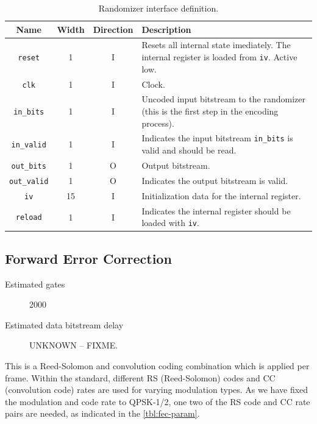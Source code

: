 \documentclass[dvips,10pt,twocolumn]{article}
\newcommand{\wire}{\texttt}
\begin{document}
\begin{table} \begin{tabularx}{\linewidth}{c|c|c|X}
	\label{tbl:rand-io}
	Name & Width & Direction & Description \\ \hline
	
	\wire{reset}     & 1  & I & Resets all internal state
	imediately. The internal register is loaded from
	\wire{iv}. Active low. \\

	\wire{clk}       & 1  & I & Clock. \\

	\wire{in\_bits}  & 1  & I & Uncoded input bitstream to the
	randomizer (this is the first step in the encoding process).\\

	\wire{in\_valid} & 1  & I & Indicates the input bitstream
	\wire{in\_bits} is valid and should be read. \\

	\wire{out\_bits} & 1  & O & Output bitstream. \\
	
	\wire{out\_valid} & 1  & O & Indicates the output bitstream
	is valid. \\

	\wire{iv}        & 15 & I & Initialization data for the
	internal register. \\

	\wire{reload}    & 1  & I & Indicates the internal
	register should be loaded with \wire{iv}. \\

\end{tabularx}
\caption{Randomizer interface definition.}
\end{table}
	

\subsection{Forward Error Correction}
\label{sec:fec}
\begin{description}
	\item[Estimated gates] 2000
	\item[Estimated data bitstream delay] UNKNOWN -- FIXME.
\end{description}

This is a Reed-Solomon and convolution coding combination
which is applied per frame. Within the standard, different
RS (Reed-Solomon) codes and CC (convolution code) rates are
used for varying modulation types. As we have fixed the
modulation and code rate to QPSK-1/2, one two of the RS
code and CC rate pairs are needed, as indicated in the
\autoref{tbl:fec-param}.
\end{document}
